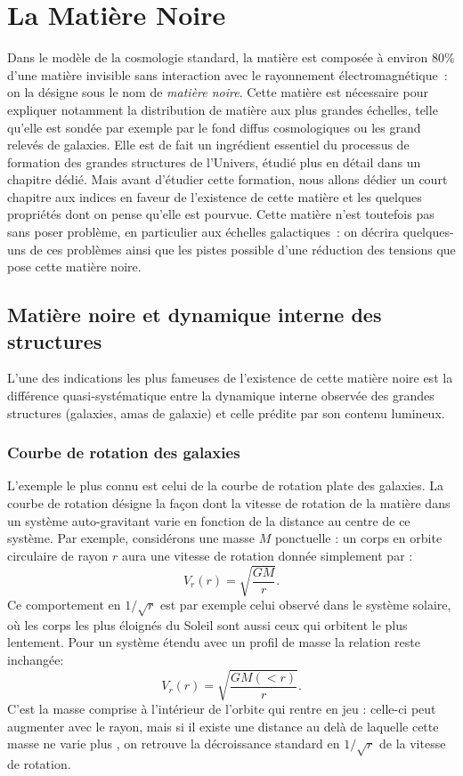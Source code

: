 \chapter{La Matière Noire}

Dans le modèle de la cosmologie standard, la matière est composée à environ $80\%$ d'une matière invisible sans interaction avec le rayonnement électromagnétique~: on la désigne sous le nom de \textit{matière noire}. Cette matière est nécessaire pour expliquer notamment la distribution de matière aux plus grandes échelles, telle qu'elle est sondée par exemple par le fond diffus cosmologiques ou les grand relevés de galaxies. Elle est de fait un ingrédient essentiel du processus de formation des grandes structures de l'Univers, étudié plus en détail dans un chapitre dédié. Mais avant d'étudier cette formation, nous allons dédier un court chapitre aux indices en faveur de l'existence de cette matière et les quelques propriétés dont on pense qu'elle est pourvue. Cette matière n'est toutefois pas sans poser problème, en particulier aux échelles galactiques~: on décrira quelques-uns de ces problèmes ainsi que les pistes possible d'une réduction des tensions que pose cette matière noire.

\section{Matière noire et dynamique interne des structures}
L'une des indications les plus fameuses de l'existence de cette matière noire est la différence quasi-systématique entre la dynamique interne observée des grandes structures (galaxies, amas de galaxie) et celle prédite par son contenu lumineux.

\subsection{Courbe de rotation des galaxies}
L'exemple le plus connu est celui de la courbe de rotation plate des galaxies. La courbe de rotation désigne  la façon dont la vitesse de rotation de la matière dans un système auto-gravitant varie en fonction de la distance au centre de ce système. Par exemple, considérons une masse $M$ ponctuelle : un corps en orbite circulaire de rayon $r$ aura une vitesse de rotation donnée simplement par :
\begin{equation}
V_r(r)=\sqrt{\frac{GM}{r}}.
\end{equation} 
Ce comportement en $1/\sqrt{r}$ est par exemple celui observé dans le système solaire, où les corps les plus éloignés du Soleil sont aussi ceux qui orbitent le plus lentement. Pour un système étendu avec un profil de masse la relation reste inchangée:
\begin{equation}
V_r(r)=\sqrt{\frac{GM(<r)}{r}}.
\end{equation}
C'est la masse comprise à l'intérieur de l'orbite qui rentre en jeu : celle-ci peut augmenter avec le rayon, mais si il existe une distance au delà de laquelle cette masse ne varie plus , on retrouve la décroissance standard en $1/\sqrt{r}$ de la vitesse de rotation.

